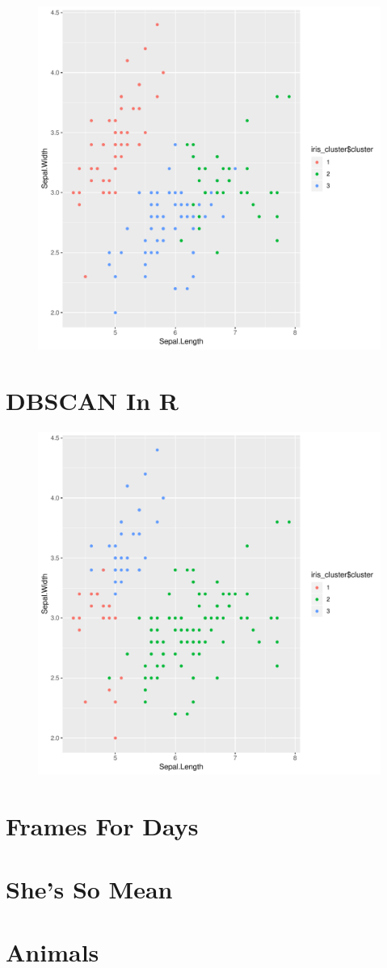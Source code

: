 \documentclass[12pt]{scrartcl}
\begin{document}
\begin{figure}[H]
    \centering
    \includegraphics[width=0.8\linewidth]{assets/problem-3.pdf}
\end{figure}


\section{DBSCAN In R}


\begin{figure}[H]
    \centering
    \includegraphics[width=0.8\linewidth]{assets/problem-4.pdf}
\end{figure}

\section{Frames For Days}


\section{She's So Mean}


\section{Animals}

\end{document}
